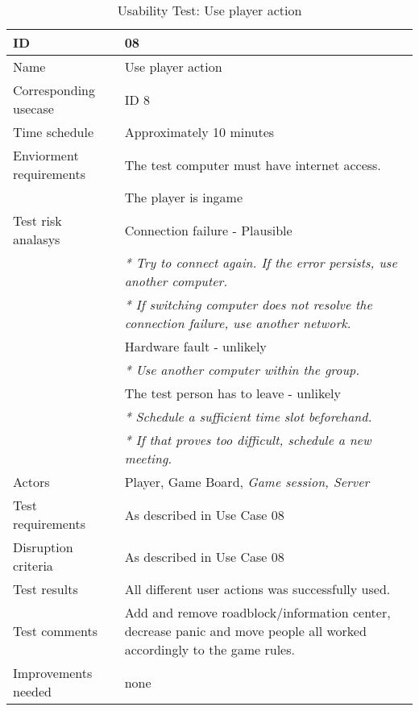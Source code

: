 {\footnotesize
\begin{table}[H]
\begin{tabular}{| p{5cm} | p{10cm} |}\hline
	\textbf{ID}	& \textbf{08} \\ \hline
	Name		& Use player action\\ \hline
	Corresponding usecase & ID 8\\ \hline
	Time schedule	& Approximately 10 minutes\\ \hline
	Enviorment requirements 
		& The test computer must have internet access. \\ 
		& The player is ingame\\ \hline
	Test risk analasys 
		& Connection failure - Plausible \\
		& \emph{* Try to connect again. If the error persists, use another computer.} \\
		& \emph{* If switching computer does not resolve the connection failure, use another network.}\\
		& Hardware fault - unlikely \\
		& \emph{* Use another computer within the group.} \\
		& The test person has to leave - unlikely \\
		& \emph{* Schedule a sufficient time slot beforehand.} \\
		& \emph{* If that proves too difficult, schedule a new meeting.}\\ \hline
	Actors	& Player, Game Board, \emph{Game session, Server}\\ \hline
	Test requirements & As described in Use Case 08 \\ \hline
	Disruption criteria & As described in Use Case 08  \\ \hline
	Test results & All different user actions was successfully used. \\ \hline
	Test comments & Add and remove roadblock/information center, decrease panic and move people all worked accordingly to the game rules. \\ \hline
	Improvements needed & none \\ \hline
\end{tabular}


\caption{Usability Test: Use player action}
\label{fig:usability_test_8}
\end{table}}






